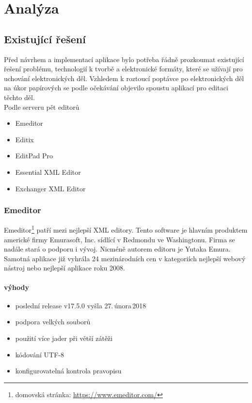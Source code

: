 \chapter{Analýza}

    \section{Existující řešení}
        Před návrhem a implementací aplikace bylo potřeba řádně prozkoumat existující řešení problému, technologií k tvorbě a elektronické formáty, které se užívají pro uchování elektronických děl. Vzhledem k roztoucí poptávce po elektronických děl na úkor papírových se podle očekávání objevilo spoustu aplikací pro editaci těchto děl.\\
        Podle serveru \cite{tei-wiki} pět editorů
        \begin{itemize}
            \item Emeditor
            \item Editix
            \item EditPad Pro
            \item Essential XML Editor 
            \item Exchanger XML Editor
        \end{itemize}

        \subsection{Emeditor}
            Emeditor\footnote{domovská stránka: \url{https://www.emeditor.com/}} patří mezi nejlepší XML editory. Tento software je hlavním produktem americké firmy Emurasoft, Inc. sídlící v Redmondu ve Washingtonu. Firma se nadále stará o podporu i vývoj. Nicméně autorem editoru je Yutaka Emura. Samotná aplikace již vyhrála 24 mezinárodních cen v kategoriích nejlepší webový nástroj nebo nejlepší aplikace roku 2008. 
            
            \subsubsection{výhody}
                \begin{itemize}
                    \item poslední release v17.5.0 vyšla 27.\,února\,2018
                    \item podpora velkých souborů
                    \item použití více jader při větší zátěži
                    \item kódování UTF-8
                    \item konfigurovatelná kontrola pravopisu
                \end{itemize}
                
